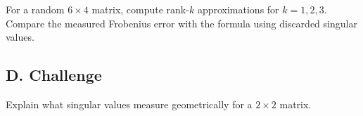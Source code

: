 \begin{exercise}
For a random $6\times 4$ matrix, compute rank-$k$ approximations for
$k=1,2,3$. Compare the measured Frobenius error with the formula using
discarded singular values.
\end{exercise}

\subsection*{D. Challenge}

\begin{exercise}
Explain what singular values measure geometrically for a $2\times 2$ matrix.
\end{exercise}
